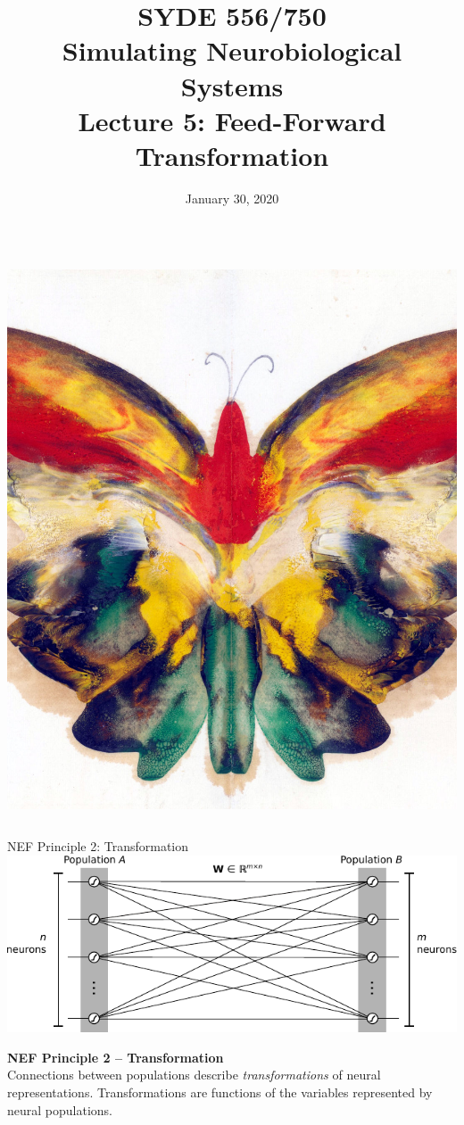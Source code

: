 \documentclass[handout,aspectratio=169]{beamer}
\date{January 30, 2020}
\title{SYDE 556/750 \\ Simulating Neurobiological Systems \\ Lecture 5: Feed-Forward Transformation}
\begin{document}
	
	\begin{frame}{}
		\vspace{0.5cm}
		\begin{columns}[c]
			\MakeTitle
			\includegraphics[width=\textwidth]{media/yellow_butterfly_by_albert_bierstadt_small.jpg}
		\end{columns}
	\end{frame}

	\begin{frame}{NEF Principle 2: Transformation}
		\centering
		\includegraphics[scale=1.175]{media/transformation_fully_connected.pdf}
		\begin{mdframed}
			\textbf{NEF Principle 2 -- Transformation}\\
			Connections between populations describe \emph{transformations} of neural representations. Transformations are functions of the variables represented by neural populations.
		\end{mdframed}
	\end{frame}
	
\end{document}
